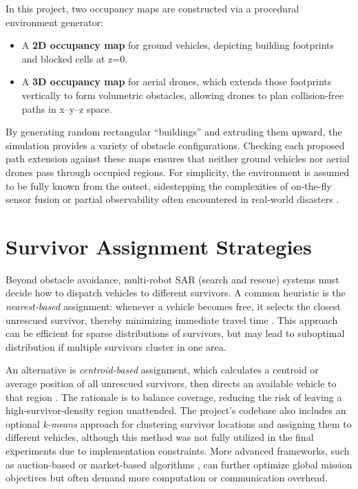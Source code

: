 \documentclass[12pt,a4paper]{report}
\begin{document}
In this project, two occupancy maps are constructed via a procedural environment generator:
\begin{itemize}
    \item A \textbf{2D occupancy map} for ground vehicles, depicting building footprints and
          blocked cells at z=0.
    \item A \textbf{3D occupancy map} for aerial drones, which extends those footprints vertically
          to form volumetric obstacles, allowing drones to plan collision-free paths in x–y–z space.
\end{itemize}
By generating random rectangular “buildings” and extruding them upward, the simulation provides a
variety of obstacle configurations. Checking each proposed path extension against these maps
ensures that neither ground vehicles nor aerial drones pass through occupied regions. 
For simplicity, the environment is assumed to be fully known from the outset, sidestepping the complexities
of on-the-fly sensor fusion or partial observability often encountered in real-world disasters
\cite{Oleynikova2018ReplanDynamic,Zhang2024ShrinkingPOMCP}.

\section{Survivor Assignment Strategies}
\label{sec:survivor_assignment}
Beyond obstacle avoidance, multi-robot SAR (search and rescue) systems must decide how to dispatch vehicles to
different survivors. A common heuristic is the \emph{nearest-based} assignment: whenever a vehicle
becomes free, it selects the closest unrescued survivor, thereby minimizing immediate travel time
\cite{Ghassemi2021NearestNeighbor}. This approach can be efficient for sparse distributions of survivors, but may
lead to suboptimal distribution if multiple survivors cluster in one area.

An alternative is \emph{centroid-based} assignment, which calculates a centroid or average position
of all unrescued survivors, then directs an available vehicle to that region \cite{Ho2016CentroidAssign}. The
rationale is to balance coverage, reducing the risk of leaving a high-survivor-density region
unattended. The project’s codebase also includes an optional \emph{k-means} approach for clustering
survivor locations and assigning them to different vehicles, although this method was not fully
utilized in the final experiments due to implementation constraints. More advanced frameworks,
such as auction-based or market-based algorithms \cite{Dias2006MarketBased}, can further optimize global mission
objectives but often demand more computation or communication overhead.
\end{document}
